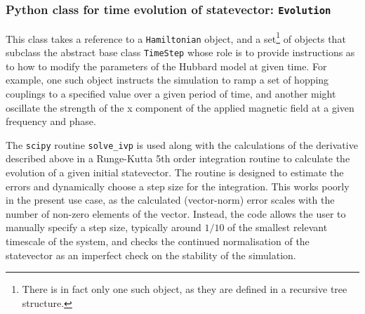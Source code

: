 \documentclass{report}
\begin{document}
\begin{appendices}
\subsubsection{Python class for time evolution of statevector: \texttt{Evolution}}

This class takes a reference to a \texttt{Hamiltonian} object, and a set\footnote{There is in fact only one such object, as they are defined in a recursive tree structure.} of objects that subclass the abstract base class \texttt{TimeStep} whose role is to provide instructions as to how to modify the parameters of the Hubbard model at given time. For example, one such object instructs the simulation to ramp a set of hopping couplings to a specified value over a given period of time, and another might oscillate the strength of the x component of the applied magnetic field at a given frequency and phase.

The \texttt{scipy} routine \texttt{solve\_ivp} is used along with the calculations of the derivative described above in a Runge-Kutta 5th order \cite{Butcher1996} integration routine to calculate the evolution of a given initial statevector. The routine is designed to estimate the errors and dynamically choose a step size for the integration. This works poorly in the present use case, as the calculated (vector-norm) error scales with the number of non-zero elements of the vector. Instead, the code allows the user to manually specify a step size, typically around $1/10$ of the smallest relevant timescale of the system, and checks the continued normalisation of the statevector as an imperfect check on the stability of the simulation.

\end{appendices}

\printbibliography %
\end{document}
